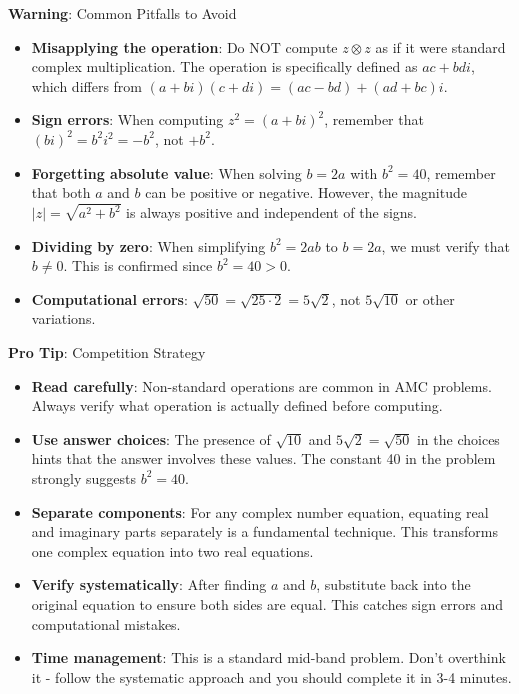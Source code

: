 \documentclass[12pt]{article}
\begin{document}
\begin{warningbox}
\textbf{Warning}: Common Pitfalls to Avoid

\begin{itemize}
    \item \textbf{Misapplying the operation}: Do NOT compute $z \otimes z$ as if it were standard complex multiplication. The operation is specifically defined as $ac + bdi$, which differs from $(a+bi)(c+di) = (ac-bd) + (ad+bc)i$.
    
    \item \textbf{Sign errors}: When computing $z^2 = (a+bi)^2$, remember that $(bi)^2 = b^2i^2 = -b^2$, not $+b^2$.
    
    \item \textbf{Forgetting absolute value}: When solving $b = 2a$ with $b^2 = 40$, remember that both $a$ and $b$ can be positive or negative. However, the magnitude $|z| = \sqrt{a^2+b^2}$ is always positive and independent of the signs.
    
    \item \textbf{Dividing by zero}: When simplifying $b^2 = 2ab$ to $b = 2a$, we must verify that $b \neq 0$. This is confirmed since $b^2 = 40 > 0$.
    
    \item \textbf{Computational errors}: $\sqrt{50} = \sqrt{25 \cdot 2} = 5\sqrt{2}$, not $5\sqrt{10}$ or other variations.
\end{itemize}
\end{warningbox}

\begin{tipbox}
\textbf{Pro Tip}: Competition Strategy

\begin{itemize}
    \item \textbf{Read carefully}: Non-standard operations are common in AMC problems. Always verify what operation is actually defined before computing.
    
    \item \textbf{Use answer choices}: The presence of $\sqrt{10}$ and $5\sqrt{2} = \sqrt{50}$ in the choices hints that the answer involves these values. The constant 40 in the problem strongly suggests $b^2 = 40$.
    
    \item \textbf{Separate components}: For any complex number equation, equating real and imaginary parts separately is a fundamental technique. This transforms one complex equation into two real equations.
    
    \item \textbf{Verify systematically}: After finding $a$ and $b$, substitute back into the original equation to ensure both sides are equal. This catches sign errors and computational mistakes.
    
    \item \textbf{Time management}: This is a standard mid-band problem. Don't overthink it - follow the systematic approach and you should complete it in 3-4 minutes.
\end{itemize}
\end{tipbox}
\end{document}

